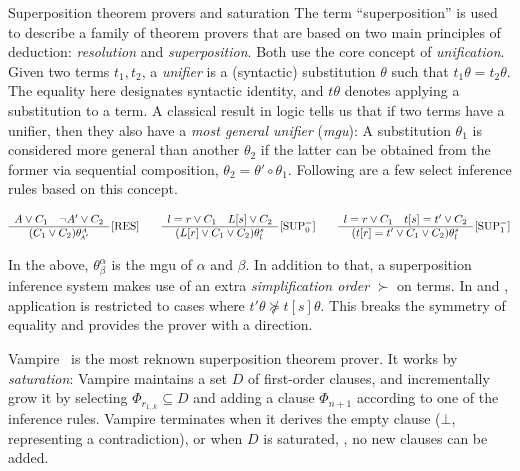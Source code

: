 \begin{paragraph}{Superposition theorem provers and saturation}
The term ``superposition'' is used to describe a family of theorem provers that are based on two main principles of deduction: \emph{resolution} and \emph{superposition}.
Both use the core concept of \emph{unification}.
Given two terms $t_1, t_2$, a \emph{unifier} is a (syntactic) substitution $\theta$ such that $t_1\theta = t_2\theta$.
The equality here designates syntactic identity, and $t\theta$ denotes applying a substitution to a term.
A classical result in logic tells us that if two terms have a unifier, then they also have a \emph{most general unifier} (\emph{mgu}):
A substitution $\theta_1$ is considered more general than another $\theta_2$ if the latter can be obtained from the former via sequential composition, $\theta_2 = \theta'\circ\theta_1$.
Following are a few select inference rules based on this concept.

\noindent\vspace{0pt}
\[
\begin{array}{c}
A \lor C_1 \quad \lnot A' \lor C_2 \\ \hline
(C_1 \lor C_2)\theta^{\scriptscriptstyle A}_{\scriptscriptstyle \!A'}
\end{array}
\,\textrm{[RES]}
\qquad
\begin{array}{c}
l=r \lor C_1 \quad L[s] \lor C_2 \\ \hline
(L[r] \lor C_1 \lor C_2)\theta^{s}_{l}
\end{array}
\,\textrm{[SUP$^=_0$]}
\qquad
\begin{array}{c}
l=r \lor C_1 \quad t[s]=t' \lor C_2 \\ \hline
(t[r]=t' \lor C_1 \lor C_2)\theta^{s}_{l}
\end{array}
\,\textrm{[SUP$^=_1$]}
\]

In the above, $\theta^{\alpha}_{\!\beta}$ is the mgu of $\alpha$ and $\beta$.
In addition to that, a superposition inference system makes use of an extra \emph{simplification order} $\succ$ on terms.
In  and ,
application is restricted to cases where
$t'\theta \not\succeq t[s]\theta$.
This breaks the symmetry of equality and provides the prover with a direction.

Vampire~\cite{vampire} is the most reknown superposition theorem prover.
It works by \emph{saturation}: Vampire maintains a set $D$ of first-order clauses,
and incrementally grow it by selecting $\Phi_{r_{1..k}} \subseteq D$ and adding a clause $\Phi_{n+1}$ according to one of the inference rules.
Vampire terminates when it derives the empty clause ($\bot$, representing a contradiction),
or when $D$ is saturated, \ie, no new clauses can be added.
\end{paragraph}

